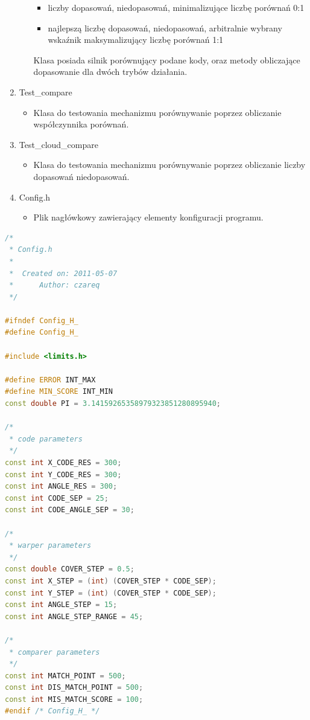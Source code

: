 \begin{enumerate}
\begin{itemize}
\begin{itemize}
			\item liczby dopasowań, niedopasowań, minimalizujące liczbę porównań 0:1
			\item najlepszą liczbę dopasowań, niedopasowań, arbitralnie wybrany wskaźnik maksymalizujący liczbę porównań 1:1
		\end{itemize}
		Klasa posiada silnik porównujący podane kody, oraz metody obliczające dopasowanie dla dwóch trybów działania.
	\end{itemize}
	\item Test\_compare
	\renewcommand*{\labelitem}{\bullet}
	\begin{itemize}
		\item Klasa do testowania mechanizmu porównywanie poprzez obliczanie współczynnika porównań.
	\end{itemize}
	\item Test\_cloud\_compare
	\renewcommand*{\labelitem}{\bullet}
	\begin{itemize}
		\item Klasa do testowania mechanizmu porównywanie poprzez obliczanie liczby dopasowań niedopasowań.
	\end{itemize}
	\item Config.h
	\renewcommand*{\labelitem}{\bullet}
	\begin{itemize}
		\item Plik nagłówkowy zawierający elementy konfiguracji programu.
	\end{itemize}
\end{enumerate}



\begin{lstlisting}[language=C++,style=outcode,caption=Przykładowa konfiguracja]
/*
 * Config.h
 *
 *  Created on: 2011-05-07
 *      Author: czareq
 */

#ifndef Config_H_
#define Config_H_

#include <limits.h>

#define ERROR INT_MAX
#define MIN_SCORE INT_MIN
const double PI = 3.14159265358979323851280895940;

/*
 * code parameters
 */
const int X_CODE_RES = 300;
const int Y_CODE_RES = 300;
const int ANGLE_RES = 300;
const int CODE_SEP = 25; 
const int CODE_ANGLE_SEP = 30;

/*
 * warper parameters
 */
const double COVER_STEP = 0.5; 
const int X_STEP = (int) (COVER_STEP * CODE_SEP);
const int Y_STEP = (int) (COVER_STEP * CODE_SEP);
const int ANGLE_STEP = 15;
const int ANGLE_STEP_RANGE = 45;

/*
 * comparer parameters
 */
const int MATCH_POINT = 500;
const int DIS_MATCH_POINT = 500;
const int MIS_MATCH_SCORE = 100;
#endif /* Config_H_ */
\end{lstlisting}
